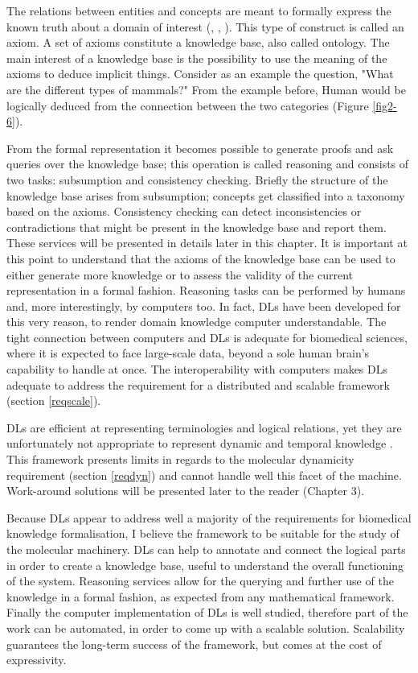 The relations between entities and concepts are meant to formally express the known truth about a domain of interest (\cite{stevens2007using}, \cite{krotzsch2012owl}, \cite{hitzler2009owl}). This type of construct is called an axiom. A set of axioms constitute a knowledge base, also called ontology. The main interest of a knowledge base is the possibility to use the meaning of the axioms to deduce implicit things. Consider as an example the question, "What are the different types of mammals?" From the example before, Human would be logically deduced from the connection between the two categories (Figure \ref{fig2-6}).

From the formal representation it becomes possible to generate proofs and ask queries over the knowledge base; this operation is called reasoning and consists of two tasks: subsumption and consistency checking. Briefly the structure of the knowledge base arises from subsumption; concepts get classified into a taxonomy based on the axioms. Consistency checking can detect inconsistencies or contradictions that might be present in the knowledge base and report them. These services will be presented in details later in this chapter. It is important at this point to understand that the axioms of the knowledge base can be used to either generate more knowledge or to assess the validity of the current representation in a formal fashion. Reasoning tasks can be performed by humans and, more interestingly, by computers too. In fact, DLs have been developed for this very reason, to render domain knowledge computer understandable. The tight connection between computers and DLs is adequate for biomedical sciences, where it is expected to face large-scale data, beyond a sole human brain's capability to handle at once. The interoperability with computers makes DLs adequate to address the requirement for a distributed and scalable framework (section \ref{reqscale}).

DLs are efficient at representing terminologies and logical relations, yet they are unfortunately not appropriate to represent dynamic and temporal knowledge \citep{kim2008temporal}. This framework presents limits in regards to the molecular dynamicity requirement (section \ref{reqdyn}) and cannot handle well this facet of the machine. Work-around solutions will be presented later to the reader (Chapter 3).

Because DLs appear to address well a majority of the requirements for biomedical knowledge formalisation, I believe the framework to be suitable for the study of the molecular machinery. DLs can help to annotate and connect the logical parts in order to create a knowledge base, useful to understand the overall functioning of the system. Reasoning services allow for the querying and further use of the knowledge in a formal fashion, as expected from any mathematical framework. Finally the computer implementation of DLs is well studied, therefore part of the work can be automated, in order to come up with a scalable solution. Scalability guarantees the long-term success of the framework, but comes at the cost of expressivity.

